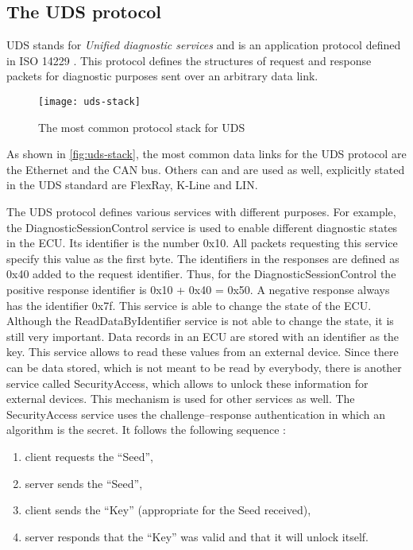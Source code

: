 \subsection{The UDS protocol}

UDS stands for \emph{Unified diagnostic services} and is an application protocol defined in ISO 14229 \cite{iso14229}. This protocol defines the structures of request and response packets for diagnostic purposes sent over an arbitrary data link.

\begin{figure}[h]
    \centering
    \texttt{[image: uds-stack]}
    \caption{The most common protocol stack for UDS \cite{Weiss2020}}
    \label{fig:uds-stack}
\end{figure}

As shown in \autoref{fig:uds-stack}, the most common data links for the UDS protocol are the Ethernet and the CAN bus. Others can and are used as well, explicitly stated in the UDS standard are FlexRay, K-Line and LIN.

The UDS protocol defines various services with different purposes. For example, the DiagnosticSessionControl service is used to enable different diagnostic states in the ECU. Its identifier is the number 0x10. All packets requesting this service specify this value as the first byte. The identifiers in the responses are defined as 0x40 added to the request identifier. Thus, for the DiagnosticSessionControl the positive response identifier is 0x10 + 0x40 = 0x50. A negative response always has the identifier 0x7f. This service is able to change the state of the ECU. Although the ReadDataByIdentifier service is not able to change the state, it is still very important. Data records in an ECU are stored with an identifier as the key. This service allows to read these values from an external device. Since there can be data stored, which is not meant to be read by everybody, there is another service called SecurityAccess, which allows to unlock these information for external devices. This mechanism is used for other services as well. The SecurityAccess service uses the challenge–response authentication in which an algorithm is the secret. It follows the following sequence \cite{iso14229}:

\begin{samepage}
\begin{enumerate}
  \item client requests the “Seed”,
  \item server sends the “Seed”,
  \item client sends the “Key” (appropriate for the Seed received),
  \item server responds that the “Key” was valid and that it will unlock itself.
\end{enumerate}
\end{samepage}

